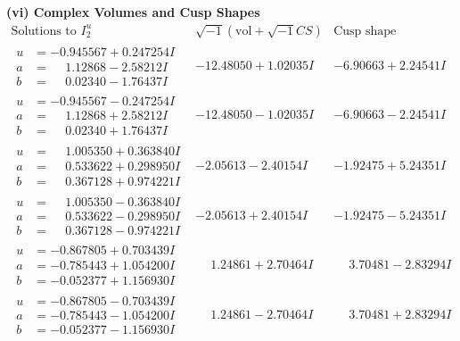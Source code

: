 \documentclass[1p]{elsarticle_modified}
\theoremstyle{definition}
\newcommand{\I}{\sqrt{-1}}
\begin{document}
\newpage\flushleft \textbf{(vi) Complex Volumes and Cusp Shapes}
$$\begin{array}{c|c|c}  
\text{Solutions to }I^u_{2}& \I (\text{vol} + \sqrt{-1}CS) & \text{Cusp shape}\\
 \hline 
\begin{aligned}
u &= -0.945567 + 0.247254 I \\
a &= \phantom{-}1.12868 - 2.58212 I \\
b &= \phantom{-}0.02340 - 1.76437 I\end{aligned}
 & -12.48050 + 1.02035 I & -6.90663 + 2.24541 I \\ \hline\begin{aligned}
u &= -0.945567 - 0.247254 I \\
a &= \phantom{-}1.12868 + 2.58212 I \\
b &= \phantom{-}0.02340 + 1.76437 I\end{aligned}
 & -12.48050 - 1.02035 I & -6.90663 - 2.24541 I \\ \hline\begin{aligned}
u &= \phantom{-}1.005350 + 0.363840 I \\
a &= \phantom{-}0.533622 + 0.298950 I \\
b &= \phantom{-}0.367128 + 0.974221 I\end{aligned}
 & -2.05613 - 2.40154 I & -1.92475 + 5.24351 I \\ \hline\begin{aligned}
u &= \phantom{-}1.005350 - 0.363840 I \\
a &= \phantom{-}0.533622 - 0.298950 I \\
b &= \phantom{-}0.367128 - 0.974221 I\end{aligned}
 & -2.05613 + 2.40154 I & -1.92475 - 5.24351 I \\ \hline\begin{aligned}
u &= -0.867805 + 0.703439 I \\
a &= -0.785443 + 1.054200 I \\
b &= -0.052377 + 1.156930 I\end{aligned}
 & \phantom{-}1.24861 + 2.70464 I & \phantom{-}3.70481 - 2.83294 I \\ \hline\begin{aligned}
u &= -0.867805 - 0.703439 I \\
a &= -0.785443 - 1.054200 I \\
b &= -0.052377 - 1.156930 I\end{aligned}
 & \phantom{-}1.24861 - 2.70464 I & \phantom{-}3.70481 + 2.83294 I \\ \hline\begin{aligned}

\end{aligned}
\end{array}$$
\end{document}
